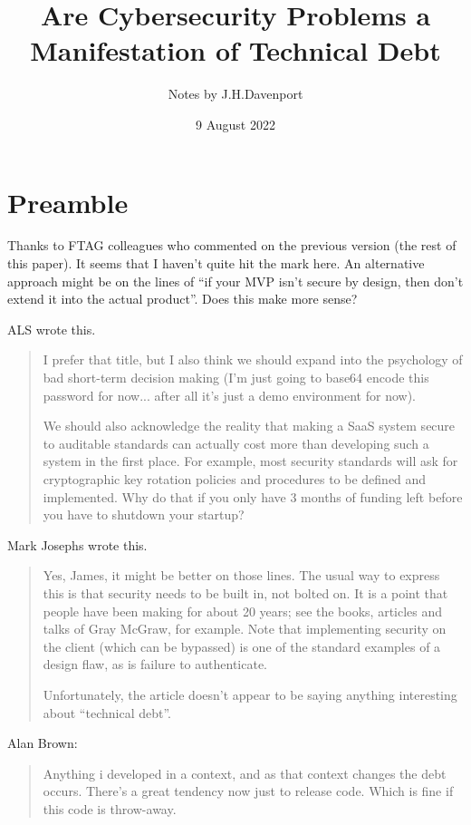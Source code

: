\documentclass{article}
\begin{document}
\author{Notes by J.H.Davenport}
\title{Are Cybersecurity Problems a Manifestation of Technical Debt}
\date{9 August 2022}
\maketitle
\section{Preamble}
Thanks to FTAG colleagues who commented on the previous version (the rest of this paper).
It seems that I haven't quite hit the mark here.
An alternative approach might be on the lines of ``if your MVP isn't secure by design, then don't extend it into the actual product''. Does this make more sense?

ALS wrote this.
\begin{quote}
I prefer that title, but I also think we should expand into the psychology of bad short-term decision making (I'm just going to base64 encode this password for now... after all it's just a demo environment for now).

We should also acknowledge the reality that making a SaaS system secure to auditable standards can actually cost more than developing such a system in the first place. For example, most security standards will ask for cryptographic key rotation policies and procedures to be defined and implemented.  Why do that if you only have 3 months of funding left before you have to shutdown your startup?

\end{quote}
Mark Josephs wrote this.
\begin{quote}
Yes, James, it might be better on those lines. The usual way to express this is that security needs to be built in, not bolted on. It is a point that people have been making for about 20 years; see the books, articles and talks of Gray McGraw, for example. Note that implementing security on the client (which can be bypassed) is one of the standard examples of a design flaw, as is failure to authenticate.

Unfortunately, the article doesn’t appear to be saying anything interesting about ``technical debt''.

\end{quote}
Alan Brown:
\begin{quote}
Anything i developed in a context, and as that context changes the debt occurs. There's a great tendency now just to release code. Which is fine if this code is throw-away.
\end{quote}
\begin{quote}
\end{quote}
\def\r{$\rightarrow$}
\end{document}
